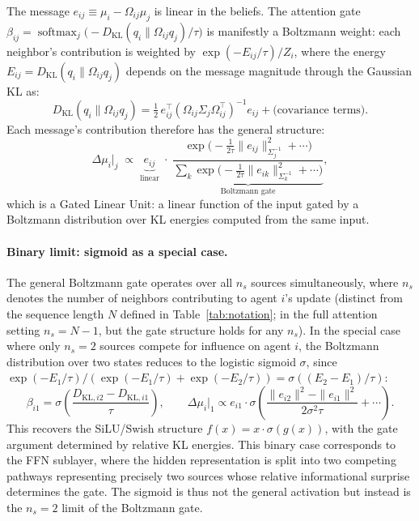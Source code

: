 \documentclass[twoside,11pt]{article}
\begin{document}
The message $e_{ij} \equiv \mu_i - \Omega_{ij}\mu_j$ is linear in the beliefs. The attention gate $\beta_{ij} = \operatorname{softmax}_j\!\bigl(-D_{\mathrm{KL}}(q_i \| \Omega_{ij}q_j)/\tau\bigr)$ is manifestly a Boltzmann weight: each neighbor's contribution is weighted by $\exp(-E_{ij}/\tau)/Z_i$, where the energy $E_{ij} = D_{\mathrm{KL}}(q_i \| \Omega_{ij}q_j)$ depends on the message magnitude through the Gaussian KL as:
%
\begin{equation}
D_{\mathrm{KL}}(q_i \| \Omega_{ij}q_j) = \tfrac{1}{2}\,e_{ij}^\top (\Omega_{ij}\Sigma_j\Omega_{ij}^\top)^{-1} e_{ij} + \text{(covariance terms)}.
\label{eq:dkl_quadratic}
\end{equation}
%
Each message's contribution therefore has the general structure:
%
\begin{equation}
\boxed{\Delta\mu_i\big|_j \;\propto\; \underbrace{e_{ij}}_{\text{linear}} \;\cdot\; \underbrace{\frac{\exp\!\bigl(-\tfrac{1}{2\tau}\|e_{ij}\|^2_{\Sigma_j^{-1}} + \cdots\bigr)}{\sum_k \exp\!\bigl(-\tfrac{1}{2\tau}\|e_{ik}\|^2_{\Sigma_k^{-1}} + \cdots\bigr)}}_{\text{Boltzmann gate}},}
\label{eq:vfe_glu}
\end{equation}
%
which is a Gated Linear Unit: a linear function of the input gated by a Boltzmann distribution over KL energies computed from the same input.

\paragraph{Binary limit: sigmoid as a special case.}

The general Boltzmann gate operates over all $n_s$ sources simultaneously, where $n_s$ denotes the number of neighbors contributing to agent $i$'s update (distinct from the sequence length $N$ defined in Table~\ref{tab:notation}; in the full attention setting $n_s = N-1$, but the gate structure holds for any $n_s$). In the special case where only $n_s = 2$ sources compete for influence on agent $i$, the Boltzmann distribution over two states reduces to the logistic sigmoid $\sigma$, since $\exp(-E_1/\tau)/(\exp(-E_1/\tau) + \exp(-E_2/\tau)) = \sigma((E_2 - E_1)/\tau)$:
%
\begin{equation}
\beta_{i1} = \sigma\!\left(\frac{D_{\mathrm{KL},i2} - D_{\mathrm{KL},i1}}{\tau}\right),
\qquad
\Delta\mu_i\big|_1 \propto e_{i1} \cdot \sigma\!\left(\frac{\|e_{i2}\|^2 - \|e_{i1}\|^2}{2\sigma^2\tau} + \cdots\right).
\label{eq:binary_silu}
\end{equation}
%
This recovers the SiLU/Swish \citep{ramachandran2018searching} structure $f(x) = x \cdot \sigma(g(x))$, with the gate argument determined by relative KL energies. This binary case corresponds to the FFN sublayer, where the hidden representation is split into two competing pathways representing precisely two sources whose relative informational surprise determines the gate. The sigmoid is thus not the general activation but instead is the $n_s = 2$ limit of the Boltzmann gate.
\end{document}

